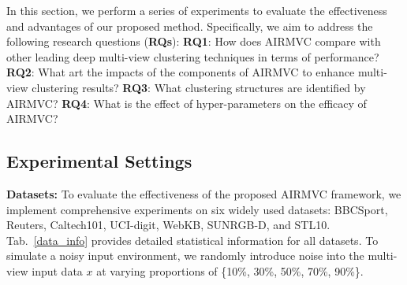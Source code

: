 \documentclass{article}
\theoremstyle{plain}
\theoremstyle{definition}
\theoremstyle{remark}
\begin{document}
In this section, we perform a series of experiments to evaluate the effectiveness and advantages of our proposed method. Specifically, we aim to address the following research questions (\textbf{RQs}): \textbf{RQ1}: How does AIRMVC compare with other leading deep multi-view clustering techniques in terms of performance? \textbf{RQ2}: What art the impacts of the components of AIRMVC to enhance multi-view clustering results? \textbf{RQ3}: What clustering structures are identified by AIRMVC? \textbf{RQ4}: What is the effect of hyper-parameters on the efficacy of AIRMVC?



\subsection{Experimental Settings}
\textbf{{Datasets:}} To evaluate the effectiveness of the proposed AIRMVC framework, we implement comprehensive experiments on six widely used datasets: BBCSport, Reuters, Caltech101, UCI-digit, WebKB, SUNRGB-D, and STL10. Tab.~\ref{data_info} provides detailed statistical information for all datasets. To simulate a noisy input environment, we randomly introduce noise into the multi-view input data $x$ at varying proportions of \{10\%, 30\%, 50\%, 70\%, 90\%\}.

\end{document}
